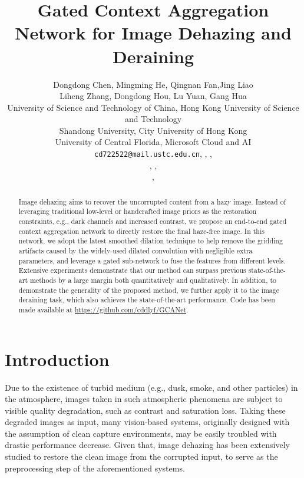 \documentclass[10pt,twocolumn,letterpaper]{article}
\begin{document}
\title{Gated Context Aggregation Network for Image Dehazing and Deraining}

\author{Dongdong Chen, \quad Mingming He, \quad  Qingnan Fan,\quad  Jing Liao\\ Liheng Zhang, \quad Dongdong Hou, \quad Lu Yuan, \quad Gang Hua\\
	University of Science and Technology of China, \qquad  Hong Kong University of Science and Technology \\
\qquad Shandong University,  \qquad City University of Hong Kong \\
\qquad University of Central Florida, \qquad Microsoft Cloud and AI \\
	{\tt\small cd722522@mail.ustc.edu.cn}, , , \\ , , \\ ,  }

\maketitle
\ifwacvfinal\thispagestyle{empty}\fi

\begin{abstract}
Image dehazing aims to recover the uncorrupted content from a hazy image. Instead of leveraging traditional low-level or handcrafted image priors as the restoration constraints, e.g., dark channels and increased contrast, we propose an end-to-end gated context aggregation network to directly restore the final haze-free image. In this network, we adopt the latest smoothed dilation technique to help remove the gridding artifacts caused by the widely-used dilated convolution with negligible extra parameters, and leverage a gated sub-network to fuse the features from different levels. Extensive experiments demonstrate that our method can surpass previous state-of-the-art methods by a large margin both quantitatively and qualitatively. In addition, to demonstrate the generality of the proposed method, we further apply it to the image deraining task, which also achieves the state-of-the-art performance.  Code has been made available at \url{https://github.com/cddlyf/GCANet}.
\end{abstract}

\section{Introduction}
Due to the existence of turbid medium (e.g., dusk, smoke, and other particles) in the atmosphere, images taken in such atmospheric phenomena are subject to visible quality degradation, such as contrast and saturation loss. Taking these degraded images as input, many vision-based systems, originally designed with the assumption of clean capture environments, may be easily troubled with drastic performance decrease. Given that, image dehazing has been extensively studied to restore the clean image from the corrupted input, to serve as the preprocessing step of the aforementioned systems. 
\end{document}
